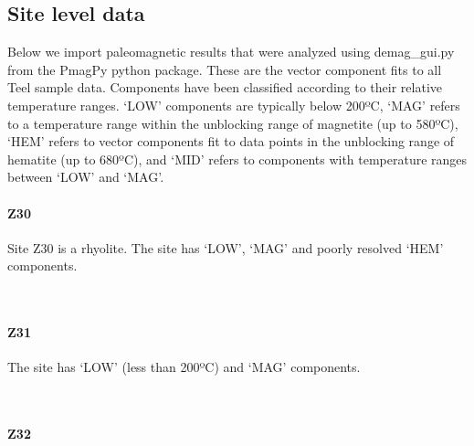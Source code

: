 \documentclass[11pt]{article}
\begin{document}
    \subsection{Site level data}\label{site-level-data}

    Below we import paleomagnetic results that were analyzed using
demag\_gui.py from the PmagPy python package. These are the vector
component fits to all Teel sample data. Components have been classified
according to their relative temperature ranges. `LOW' components are
typically below 200ºC, `MAG' refers to a temperature range within the
unblocking range of magnetite (up to 580ºC), `HEM' refers to vector
components fit to data points in the unblocking range of hematite (up to
680ºC), and `MID' refers to components with temperature ranges between
`LOW' and `MAG'.


    \paragraph{Z30}\label{z30}

    Site Z30 is a rhyolite. The site has `LOW', `MAG' and poorly resolved
`HEM' components.



    \begin{center}
    \end{center}
    { \hspace*{\fill} \\}
    
    \paragraph{Z31}\label{z31}

    The site has `LOW' (less than 200ºC) and `MAG' components.



    \begin{center}
    \end{center}
    { \hspace*{\fill} \\}
    
    \paragraph{Z32}\label{z32}
\end{document}

